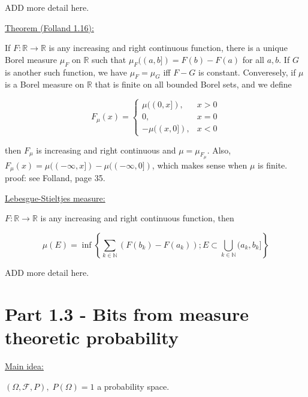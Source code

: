 \documentclass[12pt]{article}
\newcommand{\nats}[0] { \mathbb{N}}
\newcommand{\reals}[0] { \mathbb{R}}
\newcommand{\F}[0] { \mathcal{F} }
\newcommand{\Om}[0] { \Omega }
\newcommand{\rarw}[0] { \rightarrow }
\begin{document}
ADD more detail here.


\begin{flushleft}
\underline{Theorem (Folland 1.16):}
\end{flushleft}

If $F: \reals \rarw \reals$ is any increasing and right continuous function, there is a unique Borel measure $\mu_F$ on $\reals$ such that $\mu_F((a,b]) = F(b)-F(a)$ for all $a,b$. If $G$ is another such function, we have $\mu_F = \mu_G$ iff $F-G$ is constant. Converesely, if $\mu$ is a Borel measure on $\reals$ that is finite on all bounded Borel sets, and we define


\begin{displaymath}
   F_\mu(x) = \left\{
     \begin{array}{lr}
       \mu((0,x]), &  x>0 \\
       0, & x = 0 \\
       -\mu((x,0]), & x < 0
     \end{array}
   \right.
\end{displaymath} 

 then $F_\mu$ is increasing and right continuous and $\mu = \mu_{F_\mu}$. Also, $F_\mu(x) = \mu((-\infty,x]) - \mu((-\infty,0])$, which makes sense when $\mu$ is finite. \\
 
proof: see Folland, page 35.

\begin{flushleft}
\underline{Lebesgue-Stieltjes measure:}
\end{flushleft}

$F: \reals \rarw \reals$ is any increasing and right continuous function, then

$$
	\mu(E) = \inf \left\{ \sum_{k \in \nats} ( F(b_k) - F(a_k) ); E \subset \bigcup_{ k\in \nats} (a_k,b_k] \right\}
$$

ADD more detail here.







\section*{Part 1.3 - Bits from measure theoretic probability }

\begin{flushleft}
\underline{Main idea:}
\end{flushleft}


$ (\Om, \F, P ), \;  P(\Om)=1 $ a probability space.\\
\end{document}
